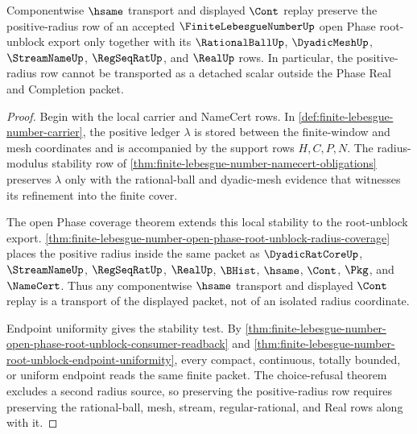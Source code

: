 \begin{theorem}
\label{thm:finite-lebesgue-number-open-phase-positive-radius-stability}
Componentwise $\hsame$ transport and displayed $\Cont$ replay preserve the positive-radius row of an accepted $\FiniteLebesgueNumberUp$ open Phase root-unblock export only together with its $\RationalBallUp$, $\DyadicMeshUp$, $\StreamNameUp$, $\RegSeqRatUp$, and $\RealUp$ rows. In particular, the positive-radius row cannot be transported as a detached scalar outside the Phase Real and Completion packet.
\end{theorem}
\begin{proof}
Begin with the local carrier and NameCert rows. In \autoref{def:finite-lebesgue-number-carrier}, the positive ledger $\lambda$ is stored between the finite-window and mesh coordinates and is accompanied by the support rows $H,C,P,N$. The radius-modulus stability row of \autoref{thm:finite-lebesgue-number-namecert-obligations} preserves $\lambda$ only with the rational-ball and dyadic-mesh evidence that witnesses its refinement into the finite cover.

The open Phase coverage theorem extends this local stability to the root-unblock export. \autoref{thm:finite-lebesgue-number-open-phase-root-unblock-radius-coverage} places the positive radius inside the same packet as $\DyadicRatCoreUp$, $\StreamNameUp$, $\RegSeqRatUp$, $\RealUp$, $\BHist$, $\hsame$, $\Cont$, $\Pkg$, and $\NameCert$. Thus any componentwise $\hsame$ transport and displayed $\Cont$ replay is a transport of the displayed packet, not of an isolated radius coordinate.

Endpoint uniformity gives the stability test. By \autoref{thm:finite-lebesgue-number-open-phase-root-unblock-consumer-readback} and \autoref{thm:finite-lebesgue-number-root-unblock-endpoint-uniformity}, every compact, continuous, totally bounded, or uniform endpoint reads the same finite packet. The choice-refusal theorem excludes a second radius source, so preserving the positive-radius row requires preserving the rational-ball, mesh, stream, regular-rational, and Real rows along with it.
\end{proof}

